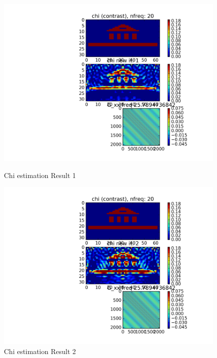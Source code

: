 \documentclass[10pt,a4paper]{article}
\begin{document}
\begin{figure}
\centering
 \includegraphics[scale=0.75]{Chi_est_it00.png}
  \caption{Chi estimation Result 1}
  \label{fig:fig4}
 \includegraphics[scale=0.75]{Chi_est_it01.png}
  \caption{Chi estimation Result 2}
  \label{fig:fig5}
\end{figure}
\end{document}
